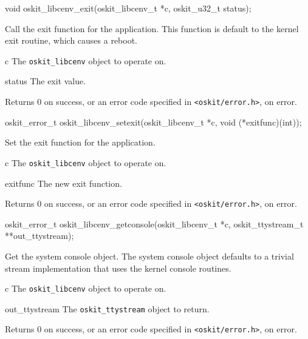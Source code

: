 \begin{apisyn}

	\funcproto void
		   oskit_libcenv_exit(oskit_libcenv_t *c,
					oskit_u32_t status);
\end{apisyn}
\begin{apidesc}
	Call the exit function for the application. This function
	is default to the \oskit{} kernel exit routine, which causes a
	reboot.
\end{apidesc}
\begin{apiparm}
	\item[c]
		The \texttt{oskit_libcenv} object to operate on.
	\item[status]
		The exit value. 
\end{apiparm}
\begin{apiret}
	Returns 0 on success, or an error code specified in
	{\tt <oskit/error.h>}, on error.
\end{apiret}


\begin{apisyn}

	\funcproto oskit_error_t
		   oskit_libcenv_setexit(oskit_libcenv_t *c,
					void (*exitfunc)(int));
\end{apisyn}
\begin{apidesc}
	Set the exit function for the application.
\end{apidesc}
\begin{apiparm}
	\item[c]
		The \texttt{oskit_libcenv} object to operate on.
	\item[exitfunc]
		The new exit function.
\end{apiparm}
\begin{apiret}
	Returns 0 on success, or an error code specified in
	{\tt <oskit/error.h>}, on error.
\end{apiret}


\begin{apisyn}

	\funcproto oskit_error_t
		   oskit_libcenv_getconsole(oskit_libcenv_t *c,
				oskit_ttystream_t **out_ttystream);
\end{apisyn}
\begin{apidesc}
	Get the system console object. The system console object
	defaults to a trivial stream implementation that uses the kernel
	console routines.
\end{apidesc}
\begin{apiparm}
	\item[c]
		The \texttt{oskit_libcenv} object to operate on.
	\item[out_ttystream]
		The \texttt{oskit_ttystream} object to return.
\end{apiparm}
\begin{apiret}
	Returns 0 on success, or an error code specified in
	{\tt <oskit/error.h>}, on error.
\end{apiret}


